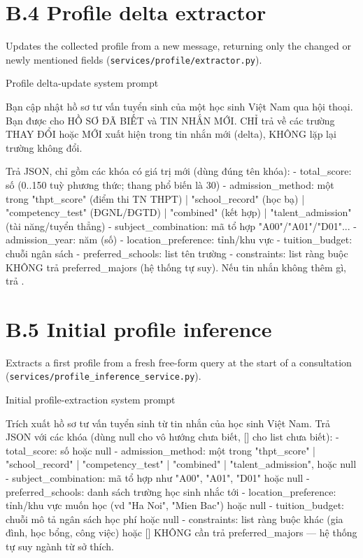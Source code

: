\documentclass[../main.tex]{subfiles}
\begin{document}
\section*{B.4 Profile delta extractor}

Updates the collected profile from a new message, returning only the changed or newly mentioned fields (\texttt{services/profile/extractor.py}).

\begin{promptbox}[label={lst:prompt-delta}]{Profile delta-update system prompt}
\begin{promptverbatim}
Bạn cập nhật hồ sơ tư vấn tuyển sinh của một học sinh Việt Nam qua hội thoại.
Bạn được cho HỒ SƠ ĐÃ BIẾT và TIN NHẮN MỚI. CHỈ trả về các trường THAY ĐỔI
hoặc MỚI xuất hiện trong tin nhắn mới (delta), KHÔNG lặp lại trường không đổi.

Trả JSON, chỉ gồm các khóa có giá trị mới (dùng đúng tên khóa):
- total_score: số (0..150 tuỳ phương thức; thang phổ biến là 30)
- admission_method: một trong "thpt_score" (điểm thi TN THPT) | "school_record" (học bạ)
  | "competency_test" (ĐGNL/ĐGTD) | "combined" (kết hợp) | "talent_admission" (tài năng/tuyển thẳng)
- subject_combination: mã tổ hợp "A00"/"A01"/"D01"...
- admission_year: năm (số)
- location_preference: tỉnh/khu vực
- tuition_budget: chuỗi ngân sách
- preferred_schools: list tên trường
- constraints: list ràng buộc
KHÔNG trả preferred_majors (hệ thống tự suy). Nếu tin nhắn không thêm gì, trả {}.
\end{promptverbatim}
\end{promptbox}

\section*{B.5 Initial profile inference}

Extracts a first profile from a fresh free-form query at the start of a consultation (\texttt{services/profile\_inference\_service.py}).

\begin{promptbox}[label={lst:prompt-profile}]{Initial profile-extraction system prompt}
\begin{promptverbatim}
Trích xuất hồ sơ tư vấn tuyển sinh từ tin nhắn của học sinh Việt Nam.
Trả JSON với các khóa (dùng null cho vô hướng chưa biết, [] cho list chưa biết):
- total_score: số hoặc null
- admission_method: một trong "thpt_score" | "school_record" | "competency_test" | "combined" | "talent_admission", hoặc null
- subject_combination: mã tổ hợp như "A00", "A01", "D01" hoặc null
- preferred_schools: danh sách trường học sinh nhắc tới
- location_preference: tỉnh/khu vực muốn học (vd "Ha Noi", "Mien Bac") hoặc null
- tuition_budget: chuỗi mô tả ngân sách học phí hoặc null
- constraints: list ràng buộc khác (gia đình, học bổng, công việc) hoặc []
KHÔNG cần trả preferred_majors — hệ thống tự suy ngành từ sở thích.
\end{promptverbatim}
\end{promptbox}
\end{document}
